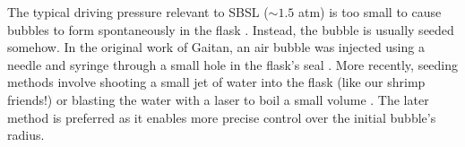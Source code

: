 \documentclass[prb,aps,nofootinbib,superscriptaddress,floatfix]{revtex4-2}
\begin{document}


The typical driving pressure relevant to SBSL ($\sim 1.5$ atm) is too small to cause bubbles to form spontaneously in the flask \cite{brenner2002single}. Instead, the bubble is usually seeded somehow. In the original work of Gaitan, an air bubble was injected using a needle and syringe through a small hole in the flask's seal \cite{gaitan1992sonoluminescence}. More recently, seeding methods involve shooting a small jet of water into the flask (like our shrimp friends!) or blasting the water with a laser to boil a small volume \cite{suslick2008inside,yasui2018acoustic}. The later method is preferred as it enables more precise control over the initial bubble's radius. 
\end{document}
